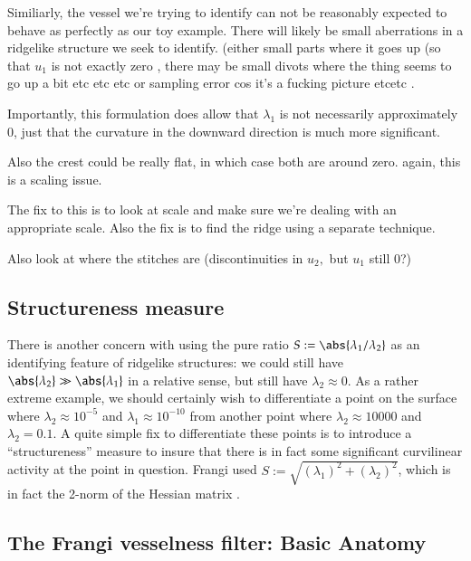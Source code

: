 Similiarly, the vessel we're trying to identify can not be reasonably expected to behave as perfectly as our toy example. There will likely be small aberrations in a ridgelike structure we seek to identify.  (either small parts where it goes up (so that $u_1$ is not exactly zero , there may be small divots where the thing seems to go up a bit etc etc etc or sampling error cos it's a fucking picture etcetc .

 Importantly, this formulation does allow that $\lambda_1$ is not necessarily approximately $0$, just that the curvature in the downward direction is much more significant.

Also the crest could be really flat, in which case both are around zero. again, this is a scaling issue.

The fix to this is to look at scale and make sure we're dealing with an appropriate scale. Also the fix is to find the ridge using a separate technique.

Also look at where the stitches are (discontinuities in $u_2,$ but $u_1$ still 0?)

\subsection{Structureness measure} \label{sec:frangi-structureness}

There is another concern with using the pure ratio $S:= \abs{\lambda_1 / \lambda_2}$ as an identifying feature of ridgelike structures: we could still have $\abs{\lambda_2} \gg \abs{\lambda_1}$ in a relative sense, but still have $\lambda_2 \approx 0$. As a rather extreme example, we should certainly wish to differentiate a point on the surface where $\lambda_2 \approx 10^{-5} $ and $\lambda_1 \approx 10^{-10}$ from another point where $\lambda_2 \approx 10000$ and $\lambda_2 = 0.1$. A quite simple fix to differentiate these points is to introduce a ``structureness'' measure to insure that there is in fact some significant curvilinear activity at the point in question. Frangi used $S:= \sqrt{(\lambda_1)^2 + (\lambda_2)^2}$, which is in fact the 2-norm of the Hessian matrix .



\subsection{The Frangi vesselness filter: Basic Anatomy}

